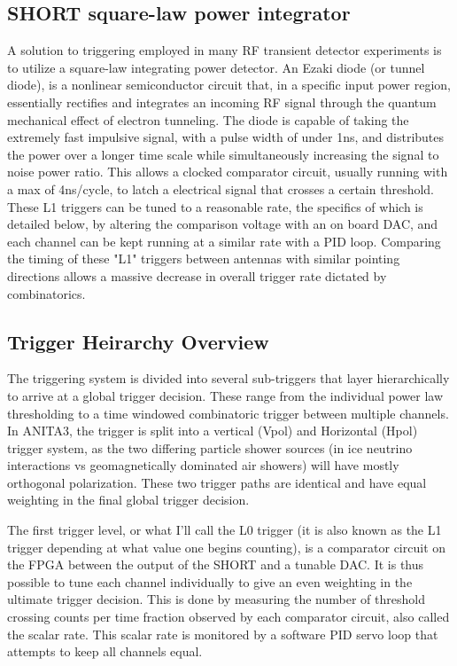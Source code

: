 	\subsection{SHORT square-law power integrator}
		A solution to triggering employed in many RF transient detector experiments is to utilize a square-law integrating power detector.  An Ezaki diode (or tunnel diode), is a nonlinear semiconductor circuit that, in a specific input power region, essentially rectifies and integrates an incoming RF signal through the quantum mechanical effect of electron tunneling.  The diode is capable of taking the extremely fast impulsive signal, with a pulse width of under 1ns, and distributes the power over a longer time scale while simultaneously increasing the signal to noise power ratio.  This allows a clocked comparator circuit, usually running with a max of 4ns/cycle, to latch a electrical signal that crosses a certain threshold.  These L1 triggers can be tuned to a reasonable rate, the specifics of which is detailed below, by altering the comparison voltage with an on board DAC, and each channel can be kept running at a similar rate with a PID loop.  Comparing the timing of these "L1" triggers between antennas with similar pointing directions allows a massive decrease in overall trigger rate dictated by combinatorics.
		
	
	\subsection{Trigger Heirarchy Overview}
		The triggering system is divided into several sub-triggers that layer hierarchically to arrive at a global trigger decision.   These range from the individual power law thresholding to a time windowed combinatoric trigger between multiple channels.  In ANITA3, the trigger is split into a vertical (Vpol) and Horizontal (Hpol) trigger system, as the two differing particle shower sources (in ice neutrino interactions vs geomagnetically dominated air showers) will have mostly orthogonal polarization.  These two trigger paths are identical and have equal weighting in the final global trigger decision.  
		
		The first trigger level, or what I'll call the L0 trigger (it is also known as the L1 trigger depending at what value one begins counting), is a comparator circuit on the FPGA between the output of the SHORT and a tunable DAC. It is thus possible to tune each channel individually to give an even weighting in the ultimate trigger decision.  This is done by measuring the number of threshold crossing counts per time fraction observed by each comparator circuit, also called the scalar rate.  This scalar rate is monitored by a software PID servo loop that attempts to keep all channels equal.
		
